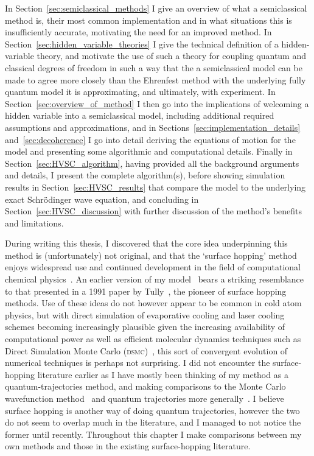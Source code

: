 In Section~\ref{sec:semiclassical_methods} I give an overview of what a semiclassical method is, their most common implementation and in what situations this is insufficiently accurate, motivating the need for an improved method. In Section~\ref{sec:hidden_variable_theories} I give the technical definition of a hidden-variable theory, and motivate the use of such a theory for coupling quantum and classical degrees of freedom in such a way that the a semiclassical model can be made to agree more closely than the Ehrenfest method with the underlying fully quantum model it is approximating, and ultimately, with experiment. In Section~\ref{sec:overview_of_method} I then go into the implications of welcoming a hidden variable into a semiclassical model, including additional required assumptions and approximations, and in Sections~\ref{sec:implementation_details} and~\ref{sec:decoherence} I go into detail deriving the equations of motion for the model and presenting some algorithmic and computational details. Finally in Section~\ref{sec:HVSC_algorithm}, having provided all the background arguments and details, I present the complete algorithm(s), before showing simulation results in Section~\ref{sec:HVSC_results} that compare the model to the underlying exact Schr\"odinger wave equation, and concluding in Section~\ref{sec:HVSC_discussion} with further discussion of the method's benefits and limitations.

During writing this thesis, I discovered that the core idea underpinning this method is (unfortunately) not original, and that the `surface hopping' method enjoys widespread use and continued development in the field of computational chemical physics~\cite{doi:10.1063/1.459170, A801824C, doi:10.1146/annurev-physchem-040215-112245, doi:10.1063/1.1675788, doi:10.1063/1.3575588, doi:10.1063/1.447708, doi:10.1063/1.3489004, doi:10.1063/1.2715585, C6SC01319H, doi:10.1063/1.479058, doi:10.1063/1.4829856}. An earlier version of my model~\cite{billington_monte_2015} bears a striking resemblance to that presented in a 1991 paper by Tully~\cite{doi:10.1063/1.459170}, the pioneer of surface hopping methods. Use of these ideas do not however appear to be common in cold atom physics, but with direct simulation of evaporative cooling and laser cooling schemes becoming increasingly plausible given the increasing availability of computational power as well as efficient molecular dynamics techniques such as Direct Simulation Monte Carlo (\textsc{dsmc})~\cite{DIETRICH1996328}, this sort of convergent evolution of numerical techniques is perhaps not surprising. I did not encounter the surface-hopping literature earlier as I have mostly been thinking of my method as a quantum-trajectories method, and making comparisons to the Monte Carlo wavefunction method~\cite{Molmer:93} and quantum trajectories more generally~\cite{1355-5111-8-1-015, 2003LNP...622..233H}. I believe surface hopping is another way of doing quantum trajectories, however the two do not seem to overlap much in the literature, and I managed to not notice the former until recently. Throughout this chapter I make comparisons between my own methods and those in the existing surface-hopping literature.

